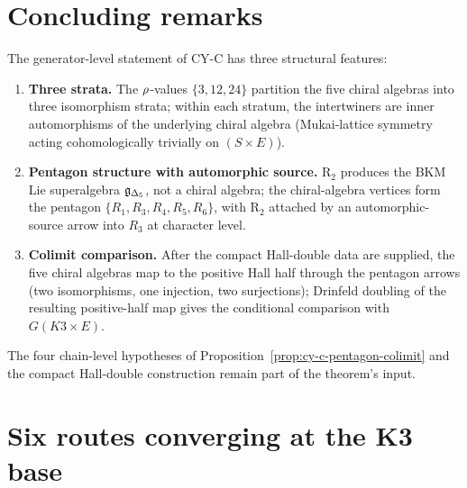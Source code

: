 \section{Concluding remarks}
\label{sec:cy-c-gl-concluding}

The generator-level statement of CY-C has three structural features:

\begin{enumerate}[label=\textup{(\roman*)}]
 \item \textbf{Three strata.} The $\rho$-values $\{3, 12, 24\}$ partition the five chiral algebras
 into three isomorphism strata; within each stratum, the intertwiners are inner automorphisms of
 the underlying chiral algebra (Mukai-lattice symmetry acting cohomologically trivially on
 $(S \times E)$).
 \item \textbf{Pentagon structure with automorphic source.} R$_2$ produces the BKM Lie superalgebra
 $\mathfrak{g}_{\Delta_5}$, not a chiral algebra; the chiral-algebra vertices form the pentagon
 $\{R_1, R_3, R_4, R_5, R_6\}$, with R$_2$ attached by an automorphic-source arrow into $R_3$ at
 character level.
 \item \textbf{Colimit comparison.} After the compact Hall-double data are supplied, the five chiral
 algebras map to the positive Hall half through the pentagon arrows (two isomorphisms, one injection, two
 surjections); Drinfeld doubling of the resulting positive-half map gives the conditional comparison with
 \(G(K3 \times E)\).
\end{enumerate}

The four chain-level hypotheses of Proposition~\ref{prop:cy-c-pentagon-colimit} and the compact Hall-double
construction remain part of the theorem's input.

\section{Six routes converging at the K3 base}
\label{sec:cyc-sixroutes-generator-level}


